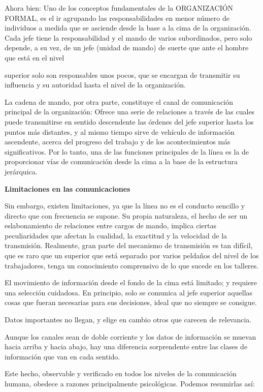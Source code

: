 Ahora bien: Uno de los conceptos fundamentales de la ORGANIZACIÓN FORMAL, es el ir agrupando las responsabilidades en menor número de individuos a medida que se asciende desde la base a la cima de la organización. Cada jefe tiene la responsabilidad y el mando de varios subordinados, pero solo depende, a su vez, de un jefe (unidad de mando) de suerte que ante el hombre que está en el nivel



superior solo son responsables unos pocos, que se encargan de transmitir su influencia y su autoridad hasta el nivel de la organización.

La cadena de mando, por otra parte, constituye el canal de comunicación principal de la organización: Ofrece una serie de relaciones a través de las cuales puede transmitirse en sentido descendente las órdenes del jefe superior hasta los puntos más distantes, y al mismo tiempo sirve de vehículo de información ascendente, acerca del progreso del trabajo y de los acontecimientos más significativos. Por lo tanto, una de las funciones principales de la línea es la de proporcionar vías de comunicación desde la cima a la base de la estructura jerárquica.

\textbf{Limitaciones en las comunicaciones}

Sin embargo, existen limitaciones, ya que la línea no es el conducto sencillo y directo que con frecuencia se supone. Su propia naturaleza, el hecho de ser un eslabonamiento de relaciones entre cargos de mando, implica ciertas peculiaridades que afectan la cualidad, la exactitud y la velocidad de la transmisión. Realmente, gran parte del mecanismo de transmisión es tan difícil, que es raro que un superior que está separado por varios peldaños del nivel de los trabajadores, tenga un conocimiento comprensivo de lo que sucede en los talleres.

El movimiento de información desde el fondo de la cima está limitado; y requiere una selección cuidadosa. En principio, solo se comunica al jefe superior aquellas cosas que fueran necesarias para sus decisiones, ideal que no siempre se consigue.

Datos importantes no llegan, y elige en cambio otros que carecen de relevancia.

Aunque los canales sean de doble corriente y los datos de información se muevan hacia arriba y hacia abajo, hay una diferencia sorprendente entre las clases de información que van en cada sentido.

Este hecho, observable y verificado en todos los niveles de la comunicación humana, obedece a razones principalmente psicológicas. Podemos resumirlas así:

